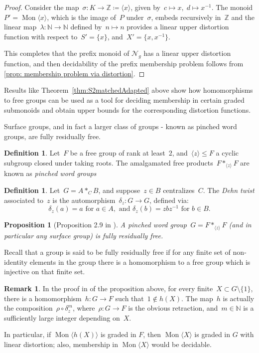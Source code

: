 \documentclass[11pt]{amsart}
\newcommand{\Mgen}[1]{\operatorname{Mon}\bigl\langle #1 \bigr\rangle}
\newcommand{\Ggen}[1]{\bigl\langle #1 \bigr\rangle}
\newcommand{\N}{\mathbb{N}}
\newcommand{\Z}{\mathbb{Z}}
\theoremstyle{plain}
\newtheorem{prop}[theorem]{Proposition}
\theoremstyle{definition}
\newtheorem{mydef}[theorem]{Definition}
\newtheorem{remark}[theorem]{Remark}
\begin{document}
\begin{proof}
Consider the map~$\sigma \colon K \longrightarrow \Z \coloneqq \Ggen{x}$, given by~$c\mapsto x,\; d \mapsto x^{-1}$. The monoid $P' = \Mgen{x}$, which is the image of~$P$ under~$\sigma$, embeds recursively in~$\Z$ and the linear map~$\lambda \colon \N \longrightarrow \N$ defined by~$n \mapsto n$ provides a linear upper distortion function with respect to~$S' = \{x\}$, and~$X' = \{x, x^{-1}\}$.

This completes that the prefix monoid of $\mathcal{N}_g$ has a linear upper distortion function, and then decidability of the prefix membership problem follows from \cref{prop: membership problem via distortion}.    
\end{proof}
Results like Theorem~\ref{thm:S2matchedAdapted} above show how homomorphisms to free groups can be used as a tool for deciding membership in certain graded submonoids and obtain upper bounds for the corresponding distortion functions.   

Surface groups, and in fact a larger class of groups - known as pinched word groups, are fully residually free.

\begin{mydef}
Let~$F$ be a free group of rank at least~$2$, and~$\langle z \rangle \leqslant F$ a cyclic subgroup closed under taking roots. The amalgamated free products~$F\ast_{\langle z \rangle} F$ are known as {\it pinched word groups}
\end{mydef}

\begin{mydef}
Let~$G = A\ast_C B$, and suppose~$z \in B$ centralizes~$C$. The {\it Dehn twist} associated to~$z$ is the automorphism~$\delta_z \colon G \rightarrow G$, defined via:
    \[
        \delta_z(a) = a \text{ for } a \in A, \text{ and } \delta_z(b) = zbz^{-1} \text{ for } b \in B.
    \]
\end{mydef}

\begin{prop}[Proposition 2.9 in \cite{wilton2005introduction}]
    A pinched word group~$G = F\ast_{\langle z \rangle} F$ (and in particular any surface group) is fully residually free.
\end{prop}

Recall that a group is said to be fully residually free if 
for any finite set of non-identity elements in the group there is a homomorphism to a free group which is injective on that finite set.

\begin{remark}\label{rem:DehnTwist}
In the proof in \cite{wilton2005introduction} of the proposition above, for every finite~$X \subset G \setminus \{1\}$, there is a homomorphism~$h \colon G \rightarrow F$ such that~$1 \not \in h(X)$. The map~$h$ is actually the composition~$\rho \circ \delta_z^m$, where~$\rho \colon G \rightarrow F$ is the obvious retraction, and~$m \in \N$ is a sufficiently large integer depending on~$X$.

In particular, if $\Mgen{h(X)}$ is graded in $F$, then $\Mgen{X}$ is graded in $G$ with linear distortion; also, membership in $\Mgen{X}$ would be decidable.
\end{remark}
\end{document}
